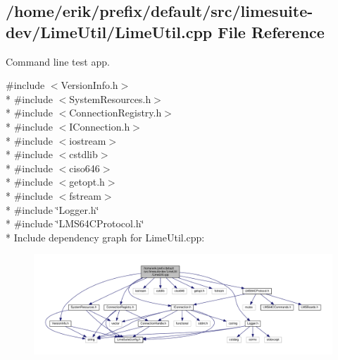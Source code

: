 \subsection{/home/erik/prefix/default/src/limesuite-\/dev/\+Lime\+Util/\+Lime\+Util.cpp File Reference}
\label{LimeUtil_8cpp}


Command line test app.  


{\ttfamily \#include $<$Version\+Info.\+h$>$}\\*
{\ttfamily \#include $<$System\+Resources.\+h$>$}\\*
{\ttfamily \#include $<$Connection\+Registry.\+h$>$}\\*
{\ttfamily \#include $<$I\+Connection.\+h$>$}\\*
{\ttfamily \#include $<$iostream$>$}\\*
{\ttfamily \#include $<$cstdlib$>$}\\*
{\ttfamily \#include $<$ciso646$>$}\\*
{\ttfamily \#include $<$getopt.\+h$>$}\\*
{\ttfamily \#include $<$fstream$>$}\\*
{\ttfamily \#include \char`\"{}Logger.\+h\char`\"{}}\\*
{\ttfamily \#include \char`\"{}L\+M\+S64\+C\+Protocol.\+h\char`\"{}}\\*
Include dependency graph for Lime\+Util.\+cpp\+:
\nopagebreak
\begin{figure}[H]
\begin{center}
\leavevmode
\includegraphics[width=350pt]{d6/dde/LimeUtil_8cpp__incl}
\end{center}
\end{figure}
